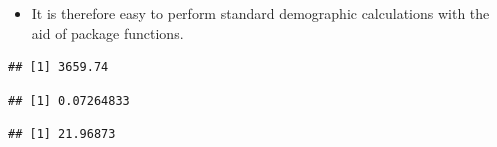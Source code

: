 \begin{frame}[fragile]

\begin{itemize}[<+->]
\itemsep1pt\parskip0pt
\item
  It is therefore easy to perform standard demographic calculations with
  the aid of package functions.
\end{itemize}

\begin{Shaded}
\begin{Highlighting}[]
 \NormalTok{, } \NormalTok{)}
\end{Highlighting}
\end{Shaded}

\begin{verbatim}
## [1] 3659.74
\end{verbatim}

\begin{Shaded}
\begin{Highlighting}[]
 \NormalTok{, } \NormalTok{)}
\end{Highlighting}
\end{Shaded}

\begin{verbatim}
## [1] 0.07264833
\end{verbatim}

\begin{Shaded}
\begin{Highlighting}[]
 \NormalTok{)}
\end{Highlighting}
\end{Shaded}

\begin{verbatim}
## [1] 21.96873
\end{verbatim}

\end{frame}

